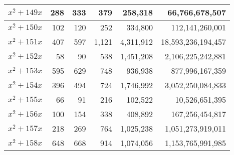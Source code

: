 \documentclass{article}
\begin{document}
\begin{center}
\begin{tabular}{ | c | r | r | r | r | r | }
$x^2 + 149x$ & 288 & 333 & 379 & 258{,}318 & 66{,}766{,}678{,}507 \\ \hline
$x^2 + 150x$ & 102 & 120 & 252 & 334{,}800 & 112{,}141{,}260{,}001 \\ \hline
$x^2 + 151x$ & 407 & 597 & 1{,}121 & 4{,}311{,}912 & 18{,}593{,}236{,}194{,}457 \\ \hline
$x^2 + 152x$ & 58 & 90 & 538 & 1{,}451{,}208 & 2{,}106{,}225{,}242{,}881 \\ \hline
$x^2 + 153x$ & 595 & 629 & 748 & 936{,}938 & 877{,}996{,}167{,}359 \\ \hline
$x^2 + 154x$ & 396 & 494 & 724 & 1{,}746{,}992 & 3{,}052{,}250{,}084{,}833 \\ \hline
$x^2 + 155x$ & 66 & 91 & 216 & 102{,}522 & 10{,}526{,}651{,}395 \\ \hline
$x^2 + 156x$ & 100 & 154 & 338 & 408{,}892 & 167{,}256{,}454{,}817 \\ \hline
$x^2 + 157x$ & 218 & 269 & 764 & 1{,}025{,}238 & 1{,}051{,}273{,}919{,}011 \\ \hline
$x^2 + 158x$ & 648 & 668 & 914 & 1{,}074{,}056 & 1{,}153{,}765{,}991{,}985 \\ \hline

\end{tabular}\pagebreak

\begin{tabular}{ | c | r | r | r | r | r | }
\hline


\end{tabular}
\end{center}
\end{document}

